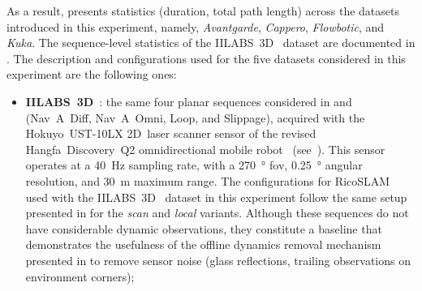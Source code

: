 As a result,  presents statistics
(duration, total path length) across the datasets introduced in this experiment,
namely, \emph{Avantgarde}, \emph{Cappero}, \emph{Flowbotic}, and \emph{Kuka}.
The sequence-level statistics of the IILABS~3D~\cite{ribeiro:access:2025}
dataset are documented in .
The description and configurations used for the five datasets considered in
this experiment are the following ones:
\begin{itemize}
\item \textbf{IILABS~3D}~\cite{ribeiro:access:2025}: the same four planar
      sequences considered in  and
      (Nav~A~Diff, Nav~A~Omni, Loop, and Slippage), acquired with the
      Hokuyo~UST-10LX 2D~laser scanner sensor of the revised
      Hangfa~Discovery~Q2 omnidirectional mobile robot~\cite{sousa:icarsc:2025}
      (see~). This sensor operates at a \SI{40}{\hertz}
      sampling rate, with a \SI{270}{\degree} \gls{fov},
      \SI{0.25}{\degree} angular resolution, and \SI{30}{\metre} maximum
      range. The configurations for RicoSLAM used with
      the IILABS~3D~\cite{ribeiro:access:2025} dataset in this experiment follow
      the same setup presented in  for
      the \emph{scan} and \emph{local} variants.
      Although these sequences do not have considerable dynamic observations,
      they constitute a baseline that demonstrates the usefulness of the
      offline dynamics removal mechanism presented in
       to remove sensor noise
      (glass reflections, trailing observations on environment corners);


\end{itemize}
